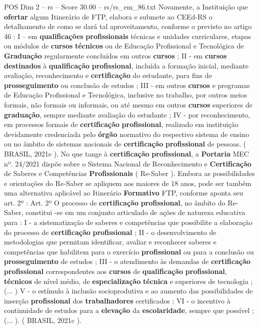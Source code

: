 \begin{textsample}{POS Dim 2 – rs – Score 30.00 – rs/rs\_em\_86.txt}
Novamente, a Instituição que \textbf{ofertar} algum Itinerário de FTP, elabora e submete ao CEEd-RS o detalhamento de como se dará tal aproveitamento, conforme o previsto no artigo 46 : I – em \textbf{qualificações} \textbf{profissionais} técnicas e unidades curriculares, etapas ou módulos de \textbf{cursos} \textbf{técnicos} ou de Educação Profissional e Tecnológica de \textbf{Graduação} regularmente concluídos em outros \textbf{cursos} ; II - em \textbf{cursos} \textbf{destinados} à \textbf{qualificação} \textbf{profissional}, incluída a formação inicial, mediante avaliação, reconhecimento e \textbf{certificação} do estudante, para fins de \textbf{prosseguimento} ou conclusão de estudos ; III - em outros \textbf{cursos} e programas de Educação Profissional e Tecnológica, inclusive no trabalho, por outros meios formais, não formais ou informais, ou até mesmo em outros \textbf{cursos} superiores de \textbf{graduação}, sempre mediante avaliação do estudante ; IV - por reconhecimento, em processos formais de \textbf{certificação} \textbf{profissional}, realizado em instituição devidamente credenciada pelo \textbf{órgão} normativo do respectivo sistema de ensino ou no âmbito de sistemas nacionais de \textbf{certificação} \textbf{profissional} de pessoas. ( BRASIL, 2021e ).
No que tange à \textbf{certificação} \textbf{profissional}, a \textbf{Portaria} MEC nº. 24/2021 dispõe sobre o Sistema Nacional de Reconhecimento e \textbf{Certificação} de Saberes e Competências \textbf{Profissionais} ( Re-Saber ).
Embora as possibilidades e orientações do Re-Saber se apliquem aos maiores de 18 anos, pode ser também uma alternativa aplicável ao Itinerário \textbf{Formativo} FTP, conforme aponta seu art. 2º : Art. 2º O processo de \textbf{certificação} \textbf{profissional}, no âmbito do Re-Saber, constitui -se em um conjunto articulado de ações de natureza educativa para : I - a sistematização de saberes e competências que possibilite a elaboração do processo de \textbf{certificação} \textbf{profissional} ; II - o desenvolvimento de metodologias que permitam identificar, avaliar e reconhecer saberes e competências que habilitem para o exercício \textbf{profissional} ou para a conclusão ou \textbf{prosseguimento} de estudos ; III - o atendimento às demandas de \textbf{certificação} \textbf{profissional} correspondentes aos \textbf{cursos} de \textbf{qualificação} \textbf{profissional}, \textbf{técnicos} de nível médio, de \textbf{especialização} \textbf{técnica} e superiores de tecnologia ; (... ) V - o estímulo à inclusão socioprodutiva e ao aumento das possibilidades de inserção \textbf{profissional} dos \textbf{trabalhadores} certificados ; VI - o incentivo à continuidade de estudos para a \textbf{elevação} da \textbf{escolaridade}, sempre que possível ; (... ). ( BRASIL, 2021c ).

\end{textsample}
